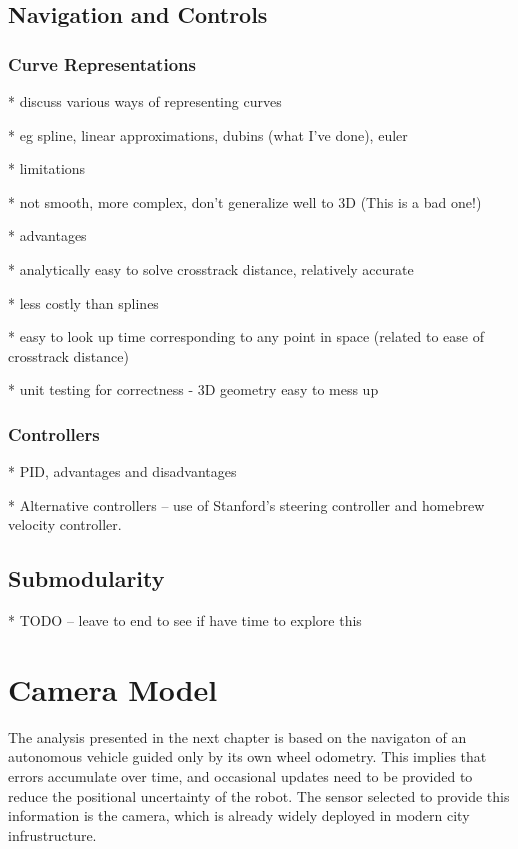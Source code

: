 \documentclass[a4paper,12pt,twoside,openright]{report}
\begin{document}
\section{Navigation and Controls}

\subsection{Curve Representations}
* discuss various ways of representing curves

* eg spline, linear approximations, dubins (what I've done), euler

* limitations

  * not smooth, more complex, don't generalize well to 3D (This is a bad one!)

* advantages

  * analytically easy to solve crosstrack distance, relatively accurate

  * less costly than splines

  * easy to look up time corresponding to any point in space (related to ease of crosstrack distance)

* unit testing for correctness - 3D geometry easy to mess up

\subsection{Controllers}
* PID, advantages and disadvantages

* Alternative controllers -- use of Stanford's steering controller and homebrew velocity controller.

\section{Submodularity}
* TODO -- leave to end to see if have time to explore this


\chapter{Camera Model}
\label{chap:cameramodel}

The analysis presented in the next chapter is based on the navigaton of an
autonomous vehicle guided only by its own wheel odometry. 
This implies that errors accumulate over time, and
occasional updates need to be provided to reduce the positional 
uncertainty of the robot. The sensor selected to provide this
information is the camera, which is already widely deployed
in modern city infrustructure.
\end{document}
